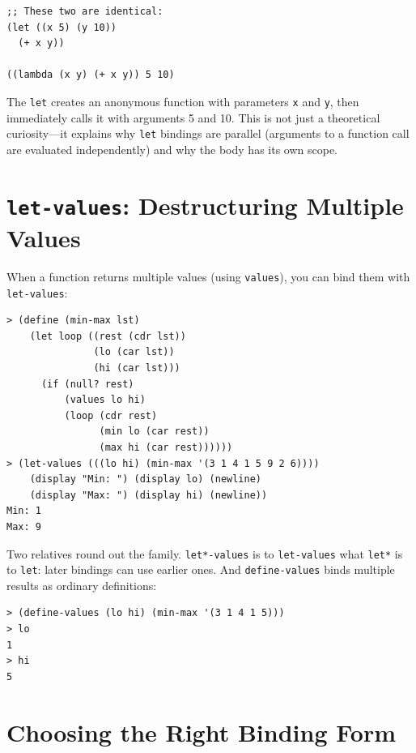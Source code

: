 \begin{lstlisting}
;; These two are identical:
(let ((x 5) (y 10))
  (+ x y))

((lambda (x y) (+ x y)) 5 10)
\end{lstlisting}

The \texttt{let} creates an anonymous function with parameters \texttt{x} and \texttt{y}, then immediately calls it with arguments 5 and 10. This is not just a theoretical curiosity---it explains why \texttt{let} bindings are parallel (arguments to a function call are evaluated independently) and why the body has its own scope.

\section{\texttt{let-values}: Destructuring Multiple Values}

When a function returns multiple values (using \texttt{values}), you can bind them with \texttt{let-values}:

\begin{lstlisting}[style=repl]
> (define (min-max lst)
    (let loop ((rest (cdr lst))
               (lo (car lst))
               (hi (car lst)))
      (if (null? rest)
          (values lo hi)
          (loop (cdr rest)
                (min lo (car rest))
                (max hi (car rest))))))
> (let-values (((lo hi) (min-max '(3 1 4 1 5 9 2 6))))
    (display "Min: ") (display lo) (newline)
    (display "Max: ") (display hi) (newline))
Min: 1
Max: 9
\end{lstlisting}

Two relatives round out the family. \texttt{let*-values} is to \texttt{let-values} what \texttt{let*} is to \texttt{let}: later bindings can use earlier ones. And \texttt{define-values} binds multiple results as ordinary definitions:

\begin{lstlisting}[style=repl]
> (define-values (lo hi) (min-max '(3 1 4 1 5)))
> lo
1
> hi
5
\end{lstlisting}

\section{Choosing the Right Binding Form}

